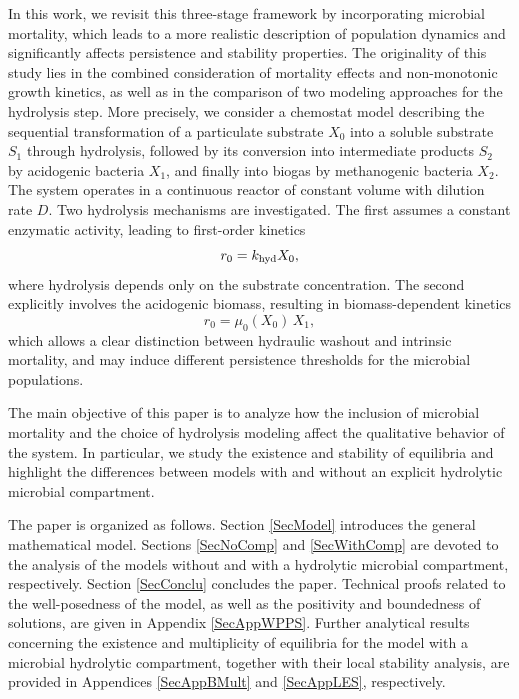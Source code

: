 \documentclass[runningheads]{llncs}
\begin{document}
In this work, we revisit this three-stage framework by incorporating microbial mortality, which leads to a more realistic description of population dynamics and significantly affects persistence and stability properties. The originality of this study lies in the combined consideration of mortality effects and non-monotonic growth kinetics, as well as in the comparison of two modeling approaches for the hydrolysis step.
More precisely, we consider a chemostat model describing the sequential transformation of a particulate substrate $X_0$ into a soluble substrate $S_1$ through hydrolysis, followed by its conversion into intermediate products $S_2$ by acidogenic bacteria $X_1$, and finally into biogas by methanogenic bacteria $X_2$. The system operates in a continuous reactor of constant volume with dilution rate $D$.
Two hydrolysis mechanisms are investigated. The first assumes a constant enzymatic activity, leading to first-order kinetics
\[
r_0 = k_{\rm hyd} X_0,
\]
where hydrolysis depends only on the substrate concentration. The second explicitly involves the acidogenic biomass, resulting in biomass-dependent kinetics
\[
r_0 = \mu_0(X_0)\, X_1,
\]
which allows a clear distinction between hydraulic washout and intrinsic mortality, and may induce different persistence thresholds for the microbial populations.

The main objective of this paper is to analyze how the inclusion of microbial mortality and the choice of hydrolysis modeling affect the qualitative behavior of the system. In particular, we study the existence and stability of equilibria and highlight the differences between models with and without an explicit hydrolytic microbial compartment.

The paper is organized as follows. Section \ref{SecModel} introduces the general mathematical model. Sections \ref{SecNoComp} and \ref{SecWithComp} are devoted to the analysis of the models without and with a hydrolytic microbial compartment, respectively. Section \ref{SecConclu} concludes the paper.
Technical proofs related to the well-posedness of the model, as well as the positivity and boundedness of solutions, are given in Appendix \ref{SecAppWPPS}. Further analytical results concerning the existence and multiplicity of equilibria for the model with a microbial hydrolytic compartment, together with their local stability analysis, are provided in Appendices \ref{SecAppBMult} and \ref{SecAppLES}, respectively.
\end{document}
